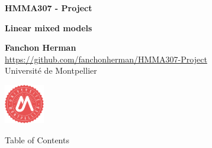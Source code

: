 \documentclass[unknownkeysallowed]{beamer}
\begin{document}



\begin{frame}[plain]
\bigskip
\bigskip
\begin{center}{
\LARGE\color{marron}
\textbf{HMMA307 - Project}
\textbf{ }\\
\vspace{0.5cm}
}

\color{marron}
\textbf{Linear mixed models}
\end{center}

\vspace{0.5cm}

\begin{center}
\textbf{Fanchon Herman} \\
\vspace{0.1cm}
\url{https://github.com/fanchonherman/HMMA307-Project}\\
\vspace{0.5cm}
Université de Montpellier \\
\end{center}

\centering
\includegraphics[width=0.13\textwidth]{./images/Logo}

\end{frame}





\begin{frame}[plain]{Table of Contents}
\tableofcontents
\end{frame}
\end{document}
